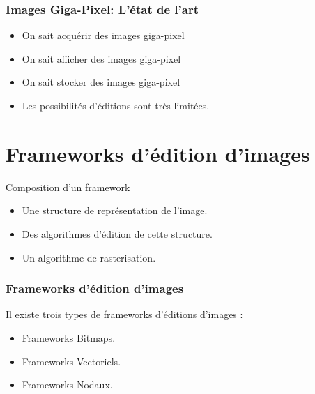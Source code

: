 \documentclass[slidetop,compress,mathserif]{beamer}
\begin{document}
	\begin{frame}
		\frametitle{Images Giga-Pixel: L'état de l'art}
		\pause
		\begin{itemize}
			\item On sait acquérir des images giga-pixel
			\pause
			\item On sait afficher des images giga-pixel
			\pause
			\item On sait stocker des images giga-pixel
			\pause
			\item Les possibilités d'éditions sont très limitées.
		\end{itemize}
	\end{frame}
	\section{Frameworks d'édition d'images}
	\begin{frame}{Composition d'un framework}
		\begin{itemize}
			\pause
			\item Une structure de représentation de l'image.
			\pause
			\item Des algorithmes d'édition de cette structure.
			\pause
			\item Un algorithme de rasterisation.
		\end{itemize}
	\end{frame}
	\begin{frame}
		\frametitle{Frameworks d'édition d'images}
		Il existe trois types de frameworks d'éditions d'images :
		\begin{itemize}
			\item Frameworks Bitmaps.
			\item Frameworks Vectoriels.
			\item Frameworks Nodaux.
		\end{itemize}
	\end{frame}
\end{document}
